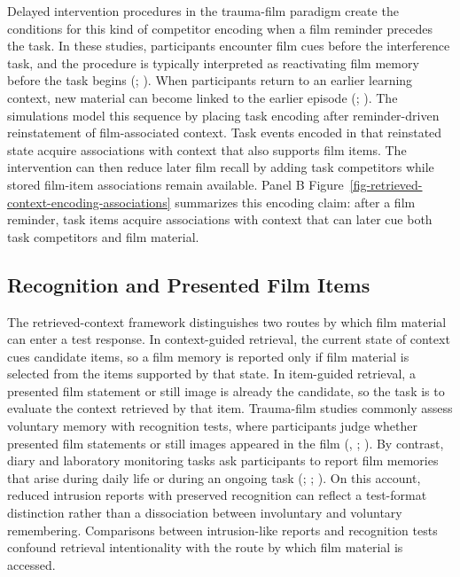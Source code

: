 \documentclass[
  man,
  floatsintext,
  longtable,
  nolmodern,
  notxfonts,
  notimes,
  draftfirst,
  colorlinks=true,linkcolor=blue,citecolor=blue,urlcolor=blue]{apa7}
\begin{document}
Delayed intervention procedures in the trauma-film paradigm create the
conditions for this kind of competitor encoding when a film reminder
precedes the task. In these studies, participants encounter film cues
before the interference task, and the procedure is typically interpreted
as reactivating film memory before the task begins
(;
). When
participants return to an earlier learning context, new material can
become linked to the earlier episode
(;
). The
simulations model this sequence by placing task encoding after
reminder-driven reinstatement of film-associated context. Task events
encoded in that reinstated state acquire associations with context that
also supports film items. The intervention can then reduce later film
recall by adding task competitors while stored film-item associations
remain available. Panel B
Figure~\ref{fig-retrieved-context-encoding-associations} summarizes this
encoding claim: after a film reminder, task items acquire associations
with context that can later cue both task competitors and film material.

\subsection{Recognition and Presented Film
Items}\label{recognition-and-presented-film-items}

The retrieved-context framework distinguishes two routes by which film
material can enter a test response. In context-guided retrieval, the
current state of context cues candidate items, so a film memory is
reported only if film material is selected from the items supported by
that state. In item-guided retrieval, a presented film statement or
still image is already the candidate, so the task is to evaluate the
context retrieved by that item. Trauma-film studies commonly assess
voluntary memory with recognition tests, where participants judge
whether presented film statements or still images appeared in the film
(,
;
). By contrast,
diary and laboratory monitoring tasks ask participants to report film
memories that arise during daily life or during an ongoing task
(;
;
). On this account,
reduced intrusion reports with preserved recognition can reflect a
test-format distinction rather than a dissociation between involuntary
and voluntary remembering. Comparisons between intrusion-like reports
and recognition tests confound retrieval intentionality with the route
by which film material is accessed.
\end{document}
